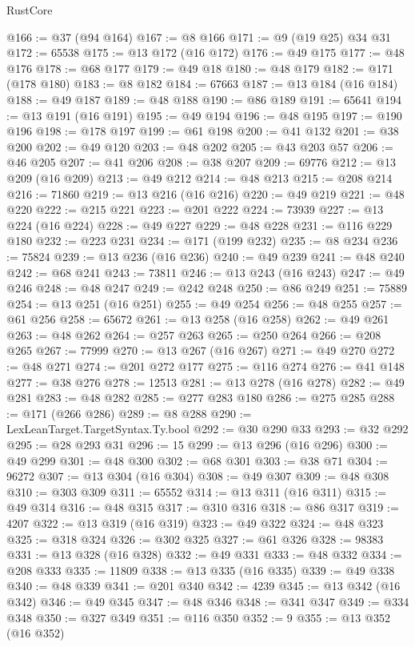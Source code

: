 \begin{lexlean}{RustCore}
\begin{coremodule}
@166 := @37 (@94 @164)
@167 := @8 @166
@171 := @9 (@19 @25) @34 @31
@172 := 65538
@175 := @13 @172 (@16 @172)
@176 := @49 @175
@177 := @48 @176
@178 := @68 @177
@179 := @49 @18
@180 := @48 @179
@182 := @171 (@178 @180)
@183 := @8 @182
@184 := 67663
@187 := @13 @184 (@16 @184)
@188 := @49 @187
@189 := @48 @188
@190 := @86 @189
@191 := 65641
@194 := @13 @191 (@16 @191)
@195 := @49 @194
@196 := @48 @195
@197 := @190 @196
@198 := @178 @197
@199 := @61 @198
@200 := @41 @132
@201 := @38 @200
@202 := @49 @120
@203 := @48 @202
@205 := @43 @203 @57
@206 := @46 @205
@207 := @41 @206
@208 := @38 @207
@209 := 69776
@212 := @13 @209 (@16 @209)
@213 := @49 @212
@214 := @48 @213
@215 := @208 @214
@216 := 71860
@219 := @13 @216 (@16 @216)
@220 := @49 @219
@221 := @48 @220
@222 := @215 @221
@223 := @201 @222
@224 := 73939
@227 := @13 @224 (@16 @224)
@228 := @49 @227
@229 := @48 @228
@231 := @116 @229 @180
@232 := @223 @231
@234 := @171 (@199 @232)
@235 := @8 @234
@236 := 75824
@239 := @13 @236 (@16 @236)
@240 := @49 @239
@241 := @48 @240
@242 := @68 @241
@243 := 73811
@246 := @13 @243 (@16 @243)
@247 := @49 @246
@248 := @48 @247
@249 := @242 @248
@250 := @86 @249
@251 := 75889
@254 := @13 @251 (@16 @251)
@255 := @49 @254
@256 := @48 @255
@257 := @61 @256
@258 := 65672
@261 := @13 @258 (@16 @258)
@262 := @49 @261
@263 := @48 @262
@264 := @257 @263
@265 := @250 @264
@266 := @208 @265
@267 := 77999
@270 := @13 @267 (@16 @267)
@271 := @49 @270
@272 := @48 @271
@274 := @201 @272 @177
@275 := @116 @274
@276 := @41 @148
@277 := @38 @276
@278 := 12513
@281 := @13 @278 (@16 @278)
@282 := @49 @281
@283 := @48 @282
@285 := @277 @283 @180
@286 := @275 @285
@288 := @171 (@266 @286)
@289 := @8 @288
@290 := LexLeanTarget.TargetSyntax.Ty.bool
@292 := @30 @290 @33
@293 := @32 @292
@295 := @28 @293 @31
@296 := 15
@299 := @13 @296 (@16 @296)
@300 := @49 @299
@301 := @48 @300
@302 := @68 @301
@303 := @38 @71
@304 := 96272
@307 := @13 @304 (@16 @304)
@308 := @49 @307
@309 := @48 @308
@310 := @303 @309
@311 := 65552
@314 := @13 @311 (@16 @311)
@315 := @49 @314
@316 := @48 @315
@317 := @310 @316
@318 := @86 @317
@319 := 4207
@322 := @13 @319 (@16 @319)
@323 := @49 @322
@324 := @48 @323
@325 := @318 @324
@326 := @302 @325
@327 := @61 @326
@328 := 98383
@331 := @13 @328 (@16 @328)
@332 := @49 @331
@333 := @48 @332
@334 := @208 @333
@335 := 11809
@338 := @13 @335 (@16 @335)
@339 := @49 @338
@340 := @48 @339
@341 := @201 @340
@342 := 4239
@345 := @13 @342 (@16 @342)
@346 := @49 @345
@347 := @48 @346
@348 := @341 @347
@349 := @334 @348
@350 := @327 @349
@351 := @116 @350
@352 := 9
@355 := @13 @352 (@16 @352)

\end{coremodule}
\end{lexlean}
